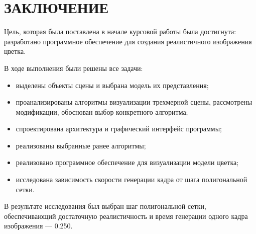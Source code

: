\chapter*{ЗАКЛЮЧЕНИЕ}

Цель, которая была поставлена в начале курсовой работы была достигнута: разработано программное обеспечение для создания реалистичного изображения цветка. 

В ходе выполнения были решены все задачи:

\begin{itemize}[label=---]
	\item выделены объекты сцены и выбрана модель их представления;
	\item проанализированы алгоритмы визуализации трехмерной сцены, рассмотрены модификации, обоснован выбор конкретного алгоритма;
	\item спроектирована архитектура и графический интерфейс программы;
	\item реализованы выбранные ранее алгоритмы;
	\item реализовано программное обеспечение для визуализации модели цветка;
	\item исследована зависимость скорости генерации кадра от шага полигональной сетки.
\end{itemize}

В результате исследования был выбран шаг полигональной сетки, обеспечивающий достаточную реалистичность и время генерации одного кадра изображения --- 0.250.